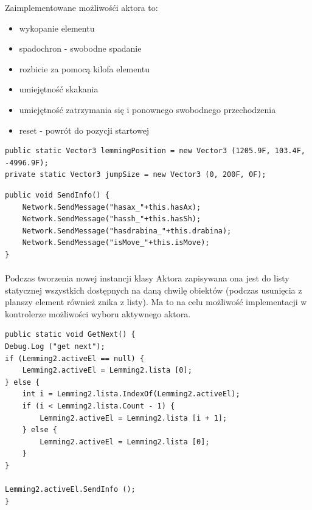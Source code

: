 Zaimplementowane możliwośći aktora to:

\begin{itemize}
	\item wykopanie elementu
	\item spadochron - swobodne spadanie
	\item rozbicie za pomocą kilofa elementu
	\item umiejętność skakania
	\item umiejętność zatrzymania się i ponownego swobodnego przechodzenia
	\item reset - powrót do pozycji startowej
\end{itemize}

\begin{lstlisting}[language=CSharp]
public static Vector3 lemmingPosition = new Vector3 (1205.9F, 103.4F, -4996.9F);
private static Vector3 jumpSize = new Vector3 (0, 200F, 0F);
\end{lstlisting}

\begin{lstlisting}[language=CSharp]
public void SendInfo() {
	Network.SendMessage("hasax_"+this.hasAx);
	Network.SendMessage("hassh_"+this.hasSh);
	Network.SendMessage("hasdrabina_"+this.drabina);
	Network.SendMessage("isMove_"+this.isMove);
}
\end{lstlisting}

\paragraph{}
Podczas tworzenia nowej instancji klasy Aktora zapisywana ona jest do listy statycznej wszystkich dostępnych na daną chwilę obiektów (podczas usunięcia z planszy element również znika z listy). Ma to na celu możliwość implementacji w kontrolerze możliwości wyboru aktywnego aktora.

\begin{lstlisting}[language=CSharp]
public static void GetNext() {
Debug.Log ("get next");
if (Lemming2.activeEl == null) {
	Lemming2.activeEl = Lemming2.lista [0];
} else {
	int i = Lemming2.lista.IndexOf(Lemming2.activeEl);
	if (i < Lemming2.lista.Count - 1) {
		Lemming2.activeEl = Lemming2.lista [i + 1];
	} else {
		Lemming2.activeEl = Lemming2.lista [0];
	}
}

Lemming2.activeEl.SendInfo ();
}
\end{lstlisting}


